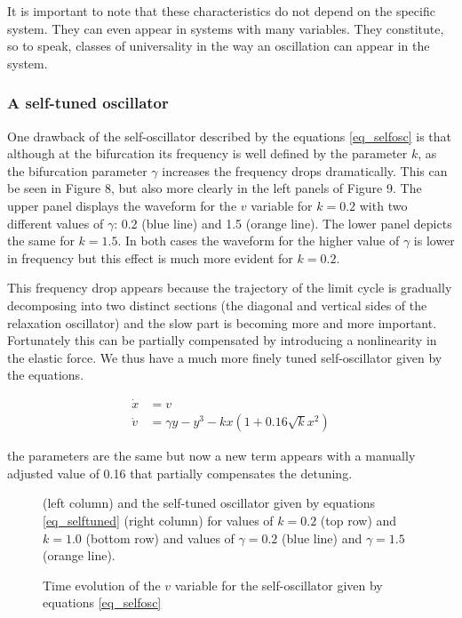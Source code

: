 \documentclass{article}
\begin{document}
It is important to note that these characteristics do not depend on the specific system. 
They can even appear in systems with many variables. 
They constitute, so to speak, classes of universality in the way an oscillation can appear in the system.




\subsubsection{A self-tuned oscillator}

One drawback of the self-oscillator described by the equations \ref{eq_selfosc} is that although at the bifurcation its frequency is well defined by the parameter $k$, as the bifurcation parameter $\gamma$ increases the frequency drops dramatically. 
This can be seen in Figure 8, but also more clearly in the left panels of Figure 9. 
The upper panel displays the waveform for the $v$ variable for $k=0.2$ with two different values of $\gamma$: 0.2 (blue line) and 1.5 (orange line). 
The lower panel depicts the same for $k=1.5$. 
In both cases the waveform for the higher value of $\gamma$ is lower in frequency but this effect is much more evident for $k=0.2$.

This frequency drop appears because the trajectory of the limit cycle is gradually decomposing into two distinct sections (the diagonal and vertical sides of the relaxation oscillator) and the slow part is becoming more and more important. 
Fortunately this can be partially compensated by introducing a nonlinearity in the elastic force. 
We thus have a much more finely tuned self-oscillator given by the equations.

\begin{subequations} \label{eq_selftuned}
\begin{align}
    \dot{x} & = v \\
    \dot{v} & = \gamma y - y^3 -kx(1+0.16\sqrt{k}x^2)
\end{align}
\end{subequations}

the parameters are the same but now a new term appears with a manually adjusted value of 0.16 that partially compensates the detuning. 

\begin{figure}[h]
    \centering
    \caption{Time evolution of the $v$ variable for the self-oscillator given by equations \ref{eq_selfosc}} (left column) and the self-tuned oscillator given by equations \ref{eq_selftuned} (right column) for values of $k=0.2$ (top row) and $k=1.0$ (bottom row) and values of $\gamma=0.2$ (blue line) and $\gamma=1.5$ (orange line). 
    \label{fig_selftunedosc}
\end{figure}
\end{document}
